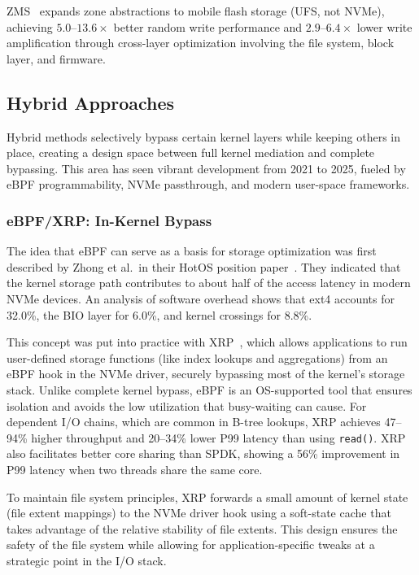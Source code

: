\documentclass[conference]{IEEEtran}
\begin{document}
ZMS~\cite{zms2024} expands zone abstractions to mobile flash storage (UFS, not NVMe), achieving $5.0$--$13.6\times$ better random write performance and $2.9$--$6.4\times$ lower write amplification through cross-layer optimization involving the file system, block layer, and firmware.

\subsection{Hybrid Approaches}
\label{sec:hybrid}

Hybrid methods selectively bypass certain kernel layers while keeping others in place, creating a design space between full kernel mediation and complete bypassing. This area has seen vibrant development from 2021 to 2025, fueled by eBPF programmability, NVMe passthrough, and modern user-space frameworks.

\subsubsection{eBPF/XRP: In-Kernel Bypass}
\label{sec:xrp}

The idea that eBPF can serve as a basis for storage optimization was first described by Zhong et al.\ in their HotOS position paper~\cite{bpf2021storage}. They indicated that the kernel storage path contributes to about half of the access latency in modern NVMe devices. An analysis of software overhead shows that ext4 accounts for 32.0\%, the BIO layer for 6.0\%, and kernel crossings for 8.8\%.

This concept was put into practice with XRP~\cite{zhong2022xrp}, which allows applications to run user-defined storage functions (like index lookups and aggregations) from an eBPF hook in the NVMe driver, securely bypassing most of the kernel's storage stack. Unlike complete kernel bypass, eBPF is an OS-supported tool that ensures isolation and avoids the low utilization that busy-waiting can cause. For dependent I/O chains, which are common in B-tree lookups, XRP achieves 47--94\% higher throughput and 20--34\% lower P99 latency than using \texttt{read()}. XRP also facilitates better core sharing than SPDK, showing a 56\% improvement in P99 latency when two threads share the same core.

To maintain file system principles, XRP forwards a small amount of kernel state (file extent mappings) to the NVMe driver hook using a soft-state cache that takes advantage of the relative stability of file extents. This design ensures the safety of the file system while allowing for application-specific tweaks at a strategic point in the I/O stack.
\end{document}
